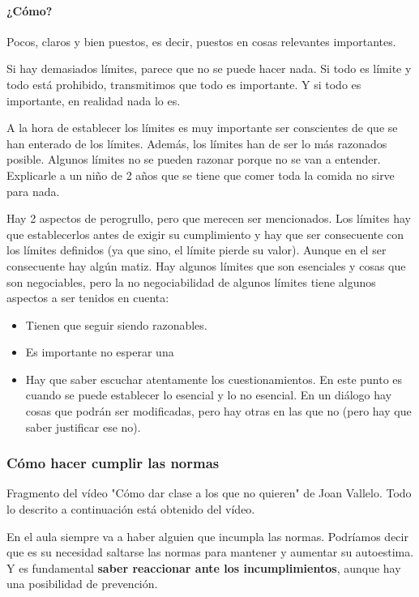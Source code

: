 \documentclass[palatino]{apuntesURJC}
\begin{document}
\paragraph{¿Cómo?} Pocos, claros y bien puestos, es decir, puestos en cosas relevantes importantes.

Si hay demasiados límites, parece que no se puede hacer nada. 
%
Si todo es límite y todo está prohibido, transmitimos que todo es importante.
%
Y si todo es importante, en realidad nada lo es.

A la hora de establecer los límites es muy importante ser conscientes de que se han enterado de los límites.
%
Además, los límites han de ser lo más razonados posible. 
%
Algunos límites no se pueden razonar porque no se van a entender.
%
Explicarle a un niño de 2 años que se tiene que comer toda la comida no sirve para nada.

Hay 2 aspectos de perogrullo, pero que merecen ser mencionados. 
%
Los límites hay que establecerlos antes de exigir su cumplimiento y hay que ser consecuente con los límites definidos (ya que sino, el límite pierde su valor).
%
Aunque en el ser consecuente hay algún matiz.
%
Hay algunos límites que son esenciales y cosas que son negociables, pero la no negociabilidad de algunos límites tiene algunos aspectos a ser tenidos en cuenta:

\begin{itemize}
	\item Tienen que seguir siendo razonables.
	\item Es importante no esperar una 
	\item Hay que saber escuchar atentamente los cuestionamientos. 
	En este punto es cuando se puede establecer lo esencial y lo no esencial.
	En un diálogo hay cosas que podrán ser modificadas, pero hay otras en las que no (pero hay que saber justificar ese no).
\end{itemize}


\subsubsection{Cómo hacer cumplir las normas}

Fragmento del vídeo "Cómo dar clase a los que no quieren" de Joan Vallelo.
%
Todo lo descrito a continuación está obtenido del vídeo.

En el aula siempre va a haber alguien que incumpla las normas.
%
Podríamos decir que es su necesidad saltarse las normas para mantener y aumentar su autoestima.
%
Y es fundamental \textbf{saber reaccionar ante los incumplimientos}, aunque hay una posibilidad de prevención.
\end{document}
